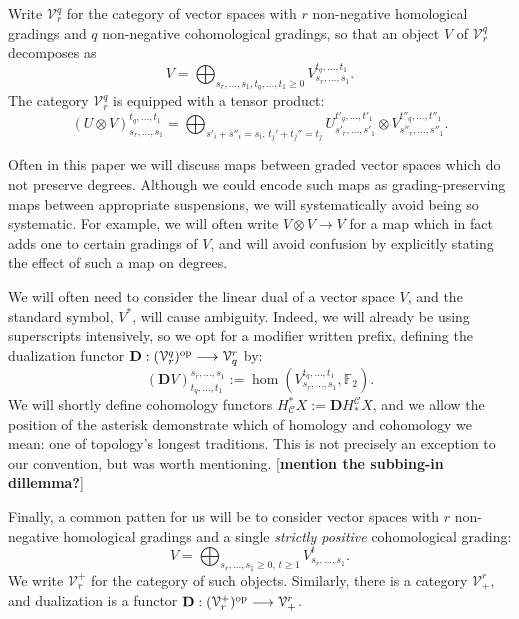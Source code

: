 \documentclass[11pt]{amsart}
\theoremstyle{plain}
\theoremstyle{definition}
\renewcommand{\to}{\longrightarrow}
\newcommand{\calC}{\mathcal{C}}
\newcommand{\calV}{\mathcal{V}}
\theoremstyle{plain}
\newcommand{\vect}[2]{\calV^{#1}_{#2}}
\newcommand{\F}{\mathbb{F}}
\newcommand{\dual}{\mathbf{D}}
\begin{document}
\begin{Conventions and notation}
Write $\vect{q}{r}$ for the category of vector spaces with $r$ non-negative homological gradings and $q$ non-negative cohomological gradings, so that an object $V$ of $\vect{q}{r}$ decomposes as
\[V=\bigoplus_{s_r,\ldots,s_1,t_q,\ldots,t_1\geq0}V^{t_q,\ldots,t_1}_{s_r,\ldots,s_1}.\]
The category $\vect{q}{r}$ is equipped with a tensor product:
\[(U\otimes V)^{t_q,\ldots,t_1}_{s_r,\ldots,s_1}=\bigoplus_{s'_i+s''_i=s_i,\,t_j'+t_j''=t_j}U^{t'_q,\ldots,t'_1}_{s'_r,\ldots,s'_1}\otimes V^{t''_q,\ldots,t''_1}_{s''_r,\ldots,s''_1}.\]

Often in this paper we will discuss maps between graded vector spaces which do not preserve degrees. %
Although we could encode such maps as grading-preserving maps between appropriate suspensions, we will systematically avoid being so systematic. For example, we will often write $V\otimes V\to V$ for a map which in fact adds one to certain gradings of $V$, and will avoid confusion by explicitly stating the effect of such a map on degrees.

We will often need to consider the linear dual of a vector space $V$, and the standard symbol, $V^*$, will cause ambiguity. Indeed, we will already be using superscripts intensively, so we opt for a modifier written prefix, defining the dualization functor
$\dual:(\vect{q}{r})^\textup{op}\to\vect{r}{q}$ by:
\[(\dual V)_{t_q,\ldots,t_1}^{s_r,\ldots,s_1}:=\hom(V^{t_q,\ldots,t_1}_{s_r,\ldots,s_1},\F_2).\]
We will shortly define cohomology functors
$H_{\calC}^*X:=\dual H^{\calC}_*X$, and we allow the position of the asterisk demonstrate which of homology and cohomology we mean: one of topology's longest traditions. This is not precisely an exception to our convention, but was worth mentioning. [\textbf{mention the subbing-in dillemma?}]

Finally, a common patten for us will be to consider vector spaces with $r$ non-negative homological gradings and a single \emph{strictly positive} cohomological grading:
\[V=\bigoplus_{s_r,\ldots,s_1\geq0,\,t\geq 1}V^{t}_{s_r,\ldots,s_1}.\]
We write $\vect{+}{r}$ for the category of such objects. Similarly, there is a category $\vect{r}{+}$, and  dualization is a functor $\dual:(\vect{+}{r})^\textup{op}\to\vect{r}{+}$.





\end{Conventions and notation}
\end{document}
